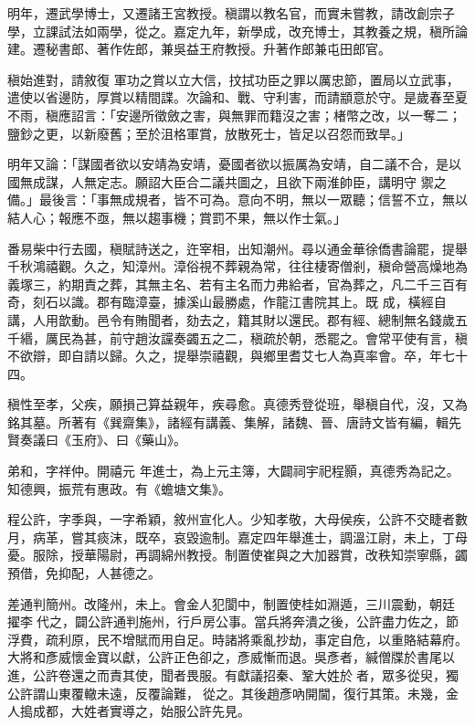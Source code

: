 \begin{pinyinscope}
 明年，遷武學博士，又遷諸王宮教授。稹謂以教名官，而實未嘗教，請改創宗子學，立課試法如兩學，從之。嘉定九年，新學成，改充博士，其教養之規，稹所論建。遷秘書郎、著作佐郎，兼吳益王府教授。升著作郎兼屯田郎官。



 稹始進對，請敘復
 軍功之賞以立大信，抆拭功臣之罪以厲忠節，置局以立武事，遣使以省邊防，厚賞以精間諜。次論和、戰、守利害，而請顓意於守。是歲春至夏不雨，稹應詔言：「安邊所徵斂之害，與無罪而籍沒之害；楮幣之改，以一奪二；鹽鈔之更，以新廢舊；至於沮格軍賞，放散死士，皆足以召怨而致旱。」



 明年又論：「謀國者欲以安靖為安靖，憂國者欲以振厲為安靖，自二議不合，是以國無成謀，人無定志。願詔大臣合二議共圖之，且欲下兩淮帥臣，講明守
 禦之備。」最後言：「事無成規者，皆不可為。意向不明，無以一眾聽；信誓不立，無以結人心；報應不亟，無以趨事機；賞罰不果，無以作士氣。」



 番易柴中行去國，稹賦詩送之，迕宰相，出知潮州。尋以通金華徐僑書論罷，提舉千秋鴻禧觀。久之，知漳州。漳俗視不葬親為常，往往棲寄僧剎，稹命營高燥地為義塚三，約期責之葬，其無主名、若有主名而力弗給者，官為葬之，凡二千三百有奇，刻石以識。郡有臨漳臺，據溪山最勝處，作龍江書院其上。既
 成，橫經自講，人用歆動。邑令有賄聞者，劾去之，籍其財以還民。郡有經、總制無名錢歲五千緡，厲民為甚，前守趙汝讜奏蠲五之二，稹疏於朝，悉罷之。會常平使有言，稹不欲辯，即自請以歸。久之，提舉崇禧觀，與鄉里耆艾七人為真率會。卒，年七十四。



 稹性至孝，父疾，願損己算益親年，疾尋愈。真德秀登從班，舉稹自代，沒，又為銘其墓。所著有《巽齋集》，諸經有講義、集解，諸魏、晉、唐詩文皆有編，輯先賢奏議曰《玉府》、曰《藥山》。



 弟和，字祥仲。開禧元
 年進士，為上元主簿，大闢祠宇祀程顥，真德秀為記之。知德興，振荒有惠政。有《蟾塘文集》。



 程公許，字季與，一字希穎，敘州宣化人。少知孝敬，大母侯疾，公許不交睫者數月，病革，嘗其痰沫，既卒，哀毀逾制。嘉定四年舉進士，調溫江尉，未上，丁母憂。服除，授華陽尉，再調綿州教授。制置使崔與之大加器賞，改秩知崇寧縣，蠲預借，免抑配，人甚德之。



 差通判簡州。改隆州，未上。會金人犯閬中，制置使桂如淵遁，三川震動，朝廷
 擢李𡌴代之，闢公許通判施州，行戶房公事。當兵將奔潰之後，公許盡力佐之，節浮費，疏利原，民不增賦而用自足。時諸將乘亂抄劫，事定自危，以重賂結幕府。大將和彥威懷金寶以獻，公許正色卻之，彥威慚而退。吳彥者，緘僧牒於書尾以進，公許卷還之而責其使，聞者畏服。有獻議招秦、鞏大姓於𡌴者，眾多從臾，獨公許謂山東覆轍未遠，反覆論難，𡌴從之。其後趙彥吶開閫，復行其策。未幾，金人搗成都，大姓者實導之，始服公許先見。




\end{pinyinscope}
